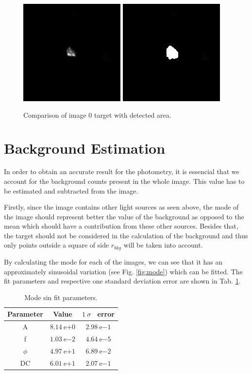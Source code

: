 \documentclass{aa}
\begin{document}
\begin{figure}
\centering

\includegraphics[width=.2\textwidth]{img_0.png}
\includegraphics[width=.2\textwidth]{img_0_canny.png}

\caption{Comparison of image 0 target with detected area.}
\label{fig:img_0_canny}
\end{figure}

\section{Background Estimation}

In order to obtain an accurate result for the photometry, it is essencial that we account for the background counts present in the whole image. This value has to be estimated and subtracted from the image.

Firstly, since the image contains other light sources as seen above, the mode of the image should represent better the value of the background as opposed to the mean which should have a contribution from these other sources. Besides that, the target should not be considered in the calculation of the background and thus only points outside a square of side $r_{bkg}$ will be taken into account.

By calculating the mode for each of the images, we can see that it has an approximately sinusoidal variation (see Fig. \ref{fig:mode}) which can be fitted. The fit parameters and respective one standard deviation error are shown in Tab. \ref{tab:mode}.

\begin{table}
\caption{Mode sin fit parameters.}
\label{tab:mode}
\centering
\begin{tabular}{c c c}
\hline
\noalign{\smallskip}
Parameter & Value & $1\ \sigma$ \ error \\
\hline
\noalign{\smallskip}
	A & $8.14\ \mathrm{e}{+0}$      & $2.98\ \mathrm{e}{-1}$ \\
	f & $1.03\ \mathrm{e}{-2}$      & $4.64\ \mathrm{e}{-5}$ \\
	$\phi$ & $4.97\ \mathrm{e}{+1}$ & $6.89\ \mathrm{e}{-2}$ \\
	DC & $6.01\ \mathrm{e}{+1}$     & $2.07\ \mathrm{e}{-1}$
\end{tabular}
\end{table}
\end{document}
